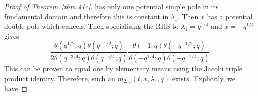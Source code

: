 \documentclass[12pt,reqno]{amsart}
\theoremstyle{definition}
\def\be{\begin{equation}}
\def\ee{\end{equation}}
\begin{document}
\begin{proof}[Proof of Theorem~\ref{thm.41c}]
has only one potential simple pole in its fundamental domain and therefore this
is constant in $\lambda_{1}$. Then $x$ has a potential double pole which cancels.
Then specialising the RHS to $\lambda_{1}=q^{1/4}$ and $x=-q^{1/4}$ gives
\be
\frac{\theta(q^{1/2};q)
  \theta(q^{-1/2};q)}{2
  \theta(q^{-3/4};q)\theta(q^{-5/4};q)}
\frac{\theta(-1;q)\theta(-q^{-1/2};q)}{\theta(-q^{1/4};q)\theta(-q^{-1/4};q)}.
\ee
This can be proven to equal one by elementary means using the Jacobi triple
product identity. Therefore, such an $m_{2,1}(t,x,\lambda_{1},q)$ exists.
Explicitly, we have

\end{proof}
\end{document}
